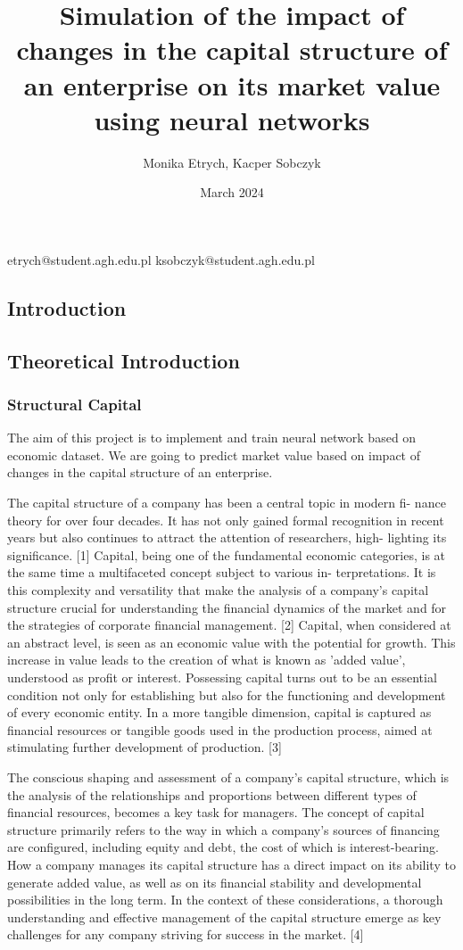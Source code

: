 \documentclass{article}
\title{Simulation of the impact of changes in the capital structure of an enterprise on its market value using neural networks}
\author{Monika Etrych, Kacper Sobczyk}
\date{March 2024}
\begin{document}
\maketitle
\centering etrych@student.agh.edu.pl ksobczyk@student.agh.edu.pl
\begin{flushleft}
\begin{justify}

\section{Introduction}
\subsection{Theoretical Introduction}
\subsubsection{Structural Capital}
The aim of this project is to implement and train neural network based on
economic dataset. We are going to predict market value based on impact of
changes in the capital structure of an enterprise.

The capital structure of a company has been a central topic in modern fi-
nance theory for over four decades. It has not only gained formal recognition
in recent years but also continues to attract the attention of researchers, high-
lighting its significance. [1] Capital, being one of the fundamental economic
categories, is at the same time a multifaceted concept subject to various in-
terpretations. It is this complexity and versatility that make the analysis of a
company’s capital structure crucial for understanding the financial dynamics of
the market and for the strategies of corporate financial management. [2]
Capital, when considered at an abstract level, is seen as an economic value
with the potential for growth. This increase in value leads to the creation of
what is known as ’added value’, understood as profit or interest. Possessing
capital turns out to be an essential condition not only for establishing but also
for the functioning and development of every economic entity. In a more tangible
dimension, capital is captured as financial resources or tangible goods used in
the production process, aimed at stimulating further development of production.
[3]

The conscious shaping and assessment of a company’s capital structure,
which is the analysis of the relationships and proportions between different types of financial resources, becomes a key task for managers. The concept of capital
structure primarily refers to the way in which a company’s sources of financing
are configured, including equity and debt, the cost of which is interest-bearing.
How a company manages its capital structure has a direct impact on its ability
to generate added value, as well as on its financial stability and developmental
possibilities in the long term. In the context of these considerations, a thorough
understanding and effective management of the capital structure emerge as key
challenges for any company striving for success in the market. [4]


\end{justify}
\end{flushleft}
\end{document}
